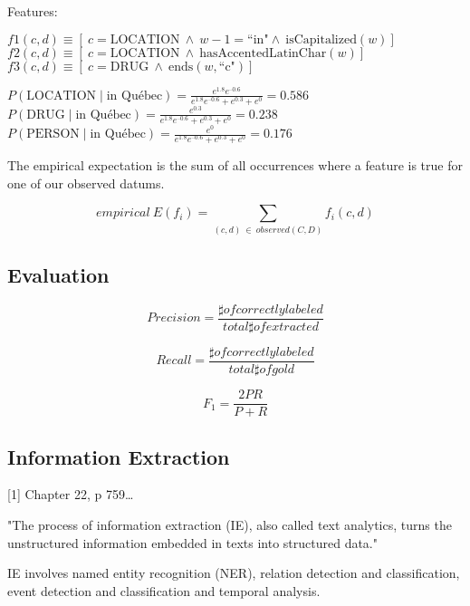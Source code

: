 Features:

$f1(c,d) \equiv [ \ c = \text{LOCATION} \ \wedge \ w-1 = \text{``in"} \wedge \ \text{isCapitalized}(w)]$\\
$f2(c,d) \equiv [ \ c = \text{LOCATION} \ \wedge \ \text{hasAccentedLatinChar}(w)]$\\
$f3(c,d) \equiv [ \ c = \text{DRUG} \ \wedge \ \text{ends}(w,\text{``c"})]$

$P(\text{LOCATION} \mid \text{in Québec}) = \frac{e^{1.8} e^{–0.6}}{e^{1.8} e^{–0.6} + e^{0.3} + e^0} = 0.586$\\
$P(\text{DRUG} \mid \text{in Québec}) = \frac{e^{0.3}}{e^{1.8} e^{–0.6} + e^{0.3} + e^0} = 0.238$\\
$P(\text{PERSON} \mid \text{in Québec}) = \frac{e^0}{e^{1.8} e^{–0.6} + e^{0.3} + e^0} = 0.176$

The empirical expectation is the sum of all occurrences where a feature is true for one of our observed datums.

\begin{equation}
  empirical \ E(f_i)= \sum_{(c,d) \ \in \ observed(C,D)}f_i(c,d)
\end{equation}

\subsection*{Evaluation}

\begin{equation}
  Precision = \frac{\sharp of correctly labeled}{total \sharp of extracted}
\end{equation}

\begin{equation}
  Recall = \frac{\sharp of correctly labeled}{total \sharp of gold}
\end{equation}

\begin{equation}
  F_1 = \frac{2PR}{P+R}
\end{equation}

\subsection*{Information Extraction}

[1] Chapter 22, p 759…

"The process of information extraction (IE), also called text analytics, turns the unstructured information embedded in texts into structured data."

IE involves named entity recognition (NER), relation detection and classification, event detection and classification and temporal analysis.

